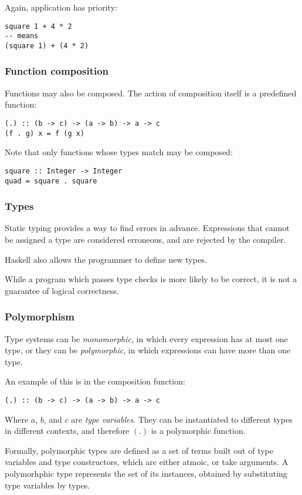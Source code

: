 Again, application has priority:
\begin{lstlisting}
square 1 + 4 * 2
-- means
(square 1) + (4 * 2)
\end{lstlisting}

\subsubsection{Function composition}
Functions may also be composed. The action of composition itself is a predefined function:

\begin{lstlisting}
(.) :: (b -> c) -> (a -> b) -> a -> c
(f . g) x = f (g x)
\end{lstlisting}

Note that only functions whose types match may be composed:
\begin{lstlisting}
square :: Integer -> Integer
quad = square . square
\end{lstlisting}

\subsubsection{Types}
Static typing provides a way to find errors in advance. Expressions that cannot be assigned a type
are considered erroneous, and are rejected by the compiler.

Haskell also allows the programmer to define new types.

While a program which passes type checks is more likely to be correct, it is not a guarantee of
logical correctness.

\subsubsection{Polymorphism}
Type systems can be \textit{monomorphic}, in which every expression has at most one type, or
they can be \textit{polymorphic}, in which expressions can have more than one type.

An example of this is in the composition function:
\begin{lstlisting}
(.) :: (b -> c) -> (a -> b) -> a -> c
\end{lstlisting}

Where $a$, $b$, and $c$ are \textit{type variables}. They can be instantiated to different types in
different contexts, and therefore $(.)$ is a polymorphic function.

Formally, polymorphic types are defined as a set of terms built out of type variables and type constructors,
which are either atmoic, or take arguments. A polymorhphic type represents the set of its instances, obtained
by substituting type variables by types.

